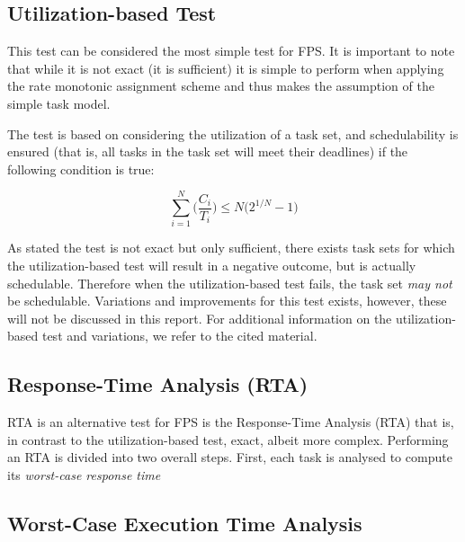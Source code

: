 \subsection{Utilization-based Test} %
\label{sub:utilization_based_test}
This test can be considered the most simple test for FPS. It is important to note that while it is not exact (it is sufficient) it is simple to perform when applying the rate monotonic assignment scheme and thus makes the assumption of the simple task model.

The test is based on considering the utilization of a task set, and schedulability is ensured (that is, all tasks in the task set will meet their deadlines) if the following condition is true:

\begin{equation}
	\sum_{i=1}^N \biggl(\frac{C_i}{T_i}\biggr) \le N\bigl( 2^{1/N} - 1 \bigr)
\end{equation}

As stated the test is not exact but only sufficient, there exists task sets for which the utilization-based test will result in a negative outcome, but is actually schedulable. Therefore when the utilization-based test fails, the task set \textit{may not} be schedulable. Variations and improvements for this test exists, however, these will not be discussed in this report. For additional information on the utilization-based test and variations, we refer to the cited material.


\subsection{Response-Time Analysis (RTA)} %
\label{sub:response_time_analysis_}
RTA is an alternative test for FPS is the Response-Time Analysis (RTA) that is, in contrast to the utilization-based test, exact, albeit more complex. Performing an RTA is divided into two overall steps. First, each task is analysed to compute its \textit{worst-case response time}



\subsection{Worst-Case Execution Time Analysis} %
\label{sub:worst_case_execution_time_analysis}




